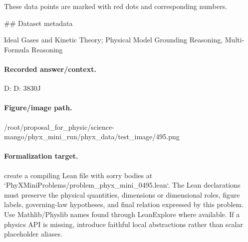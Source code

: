 These data points are marked with red dots and corresponding numbers.

\#\# Dataset metadata

Ideal Gases and Kinetic Theory; Physical Model Grounding Reasoning, Multi-Formula Reasoning

\paragraph{Recorded answer/context.}
D: D: 3830J

\paragraph{Figure/image path.}
/root/proposal\_for\_physic/science-mango/phyx\_mini\_run/phyx\_data/test\_image/495.png

\paragraph{Formalization target.}
create a compiling Lean file with sorry bodies at `PhyXMiniProblems/problem\_phyx\_mini\_0495.lean`. The Lean declarations must preserve the physical quantities, dimensions or dimensional roles, figure labels, governing-law hypotheses, and final relation expressed by this problem.
Use Mathlib/Physlib names found through LeanExplore where available. If a physics API is missing, introduce faithful local abstractions rather than scalar placeholder aliases.

